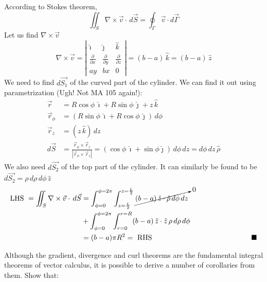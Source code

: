 \documentclass[../main.tex]{subfiles}
\begin{document}
\begin{questions}
\begin{parts}
\begin{solution}
\begin{center}
		\end{center}
		According to Stokes theorem,
		\begin{equation}
			\iint_S \nabla\times\vec{v}\cdot\,d\vec{S} = \oint_{\Gamma} \vec{v}\cdot d\vec{\Gamma}
		\end{equation}
		Let us find $\nabla\times\vec{v}$
		\begin{equation}
			\nabla\times\vec{v}
			=
			\left|\begin{matrix}
				\hat{\imath} & \hat{\jmath} & \hat{k} \\
				\frac{\partial}{\partial x} & \frac{\partial}{\partial y} & \frac{\partial}{\partial z} \\
				ay & bx & 0
			\end{matrix}\right|
			= (b-a)\,\hat{k} = (b-a)\,\hat{z}
		\end{equation}
		We need to find $d\vec{S_1}$ of the curved part of the cylinder. We can find it out using parametrization (Ugh! Not MA 105 again!):
		\begin{align}
			\vec{r} &= R\cos\phi\,\hat{\imath} + R\sin\phi\,\hat{\jmath} + z\,\hat{k} \\
			\vec{r}_\phi &= (R\sin\phi\,\hat{\imath} + R\cos\phi\,\hat{\jmath})\,d\phi \\
			\vec{r}_z &= (z\,\hat{k})\,dz \\
			d\vec{S} &= \frac{\vec{r}_\phi\times\vec{r}_z}{|\vec{r}_\phi\times\vec{r}_z|} = (\cos\phi\,\hat{\imath} + \sin\phi\hat{\jmath})\,d\phi\,dz= d\phi\,dz\,\hat{\rho}
		\end{align}
		We also need $d\vec{S_2}$ of the top part of the cylinder. It can similarly be found to be $d\vec{S_2} = \rho\,d\rho\,d\phi\,\hat{z}$
		\begin{align}
			\text{LHS } = \iint_S \nabla\times\vec{v}\cdot\,d\vec{S} &= \int^{\phi=2\pi}_{\phi=0}\int^{z=\frac{L}{2}}_{z=\frac{L}{2}}\cancelto{0}{(b-a)\,\hat{z}\cdot\hat{\rho}\,d\phi\,dz} \\
			&+ \int^{\phi=2\pi}_{\phi=0}\int^{r=R}_{r=0} (b-a)\,\hat{z}\cdot\hat{z}\,\rho\,d\rho\,d\phi \\
			&= (b-a)\pi R^2 = \text{ RHS} \hskip0.4\textwidth\blacksquare
		\end{align}
	\end{solution}
\end{parts}

\question Although the gradient, divergence and curl theorems are the fundamental integral theorems of vector calculus, it is possible to derive a number of corollaries from them. Show that:\label{q:7}
\begin{parts}

\end{parts}
\end{questions}
\end{document}
